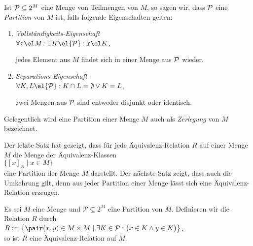\begin{Definition}[Partition] 
Ist ${\cal P} \subseteq 2^M$ eine Menge von Teilmengen von $M$, so sagen wir, dass ${\cal P}$ eine 
\emph{Partition} von $M$ ist, falls folgende Eigenschaften gelten:
\begin{enumerate}
\item \emph{Vollständigkeits-Eigenschaft} 
      \\[0.2cm]
      \hspace*{1.3cm}
      $\forall x \el M : \exists K \el {\cal P} : x \el K$,

      jedes Element aus $M$ findet sich  in einer Menge aus ${\cal P}$ wieder.
\item \emph{Separations-Eigenschaft} 
      \\[0.2cm]
      \hspace*{1.3cm}
      $\forall K, L \el {\cal P} : K \cap L =\emptyset \vee K = L$,

      zwei Mengen aus ${\cal P}$ sind  entweder disjunkt oder identisch.
\end{enumerate}
Gelegentlich wird eine Partition einer Menge $M$ auch als \emph{Zerlegung} von $M$
bezeichnet.
\end{Definition}

\remark
Der letzte Satz hat gezeigt, dass für jede Äquivalenz-Relation $R$ auf einer Menge $M$ die Menge
der Äquivalenz-Klassen 
\\[0.2cm]
\hspace*{1.3cm}
$\bigl\{ [x]_R \mid x \in M \bigr\}$
\\[0.2cm]
eine Partition der Menge $M$ darstellt.  Der nächste Satz zeigt, dass auch die Umkehrung gilt, denn
aus jeder Partition einer Menge lässt sich eine Äquivalenz-Relation erzeugen.

\begin{Satz} 
Es sei $M$ eine Menge und $\mathcal{P} \subseteq 2^M$ eine
Partition von $M$.  Definieren wir die Relation $R$ durch
\\[0.2cm]
\hspace*{1.3cm}
$R := \bigl\{ \pair(x,y) \in M \times M \mid \exists K \in \mathcal{P}: \bigl(x \in K \wedge y \in K\bigr) \bigr\}$,
\\[0.2cm]
so ist $R$ eine Äquivalenz-Relation auf $M$.
\end{Satz}


